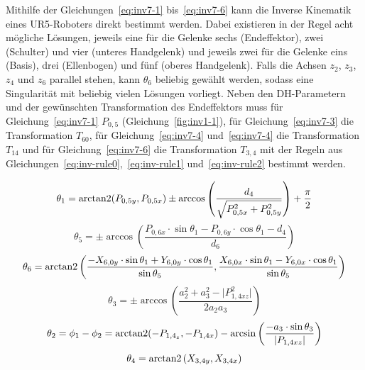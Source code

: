 Mithilfe der Gleichungen~\ref{eq:inv7-1} bis~\ref{eq:inv7-6} kann die Inverse Kinematik eines UR5-Roboters direkt bestimmt werden.
Dabei existieren in der Regel acht mögliche Lösungen, jeweils eine für die Gelenke sechs (Endeffektor), zwei (Schulter) und vier (unteres Handgelenk) und jeweils zwei für die Gelenke eins (Basis), drei (Ellenbogen) und fünf (oberes Handgelenk).
Falls die Achsen $z_2$, $z_3$, $z_4$ und $z_6$ parallel stehen, kann $\theta_6$ beliebig gewählt werden, sodass eine Singularität mit beliebig vielen Lösungen vorliegt.
Neben den DH-Parametern und der gewünschten Transformation des Endeffektors muss für Gleichung~\ref{eq:inv7-1} $P_{0,5}$ (Gleichung~\ref{fig:inv1-1}), für Gleichung~\ref{eq:inv7-3} die Transformation $T_{60}$, für Gleichung~\ref{eq:inv7-4} und~\ref{eq:inv7-4} die Transformation $T_{14}$ und für Gleichung~\ref{eq:inv7-6} die Transformation $T_{3,4}$ mit der Regeln aus Gleichungen~\ref{eq:inv-rule0},~\ref{eq:inv-rule1} und~\ref{eq:inv-rule2} bestimmt werden.

\begin{equation}
    \theta_1 = \operatorname{arctan2}(P_{0,5y}, P_{0,5x}) \pm \arccos \left( \frac{d_4}{ \sqrt{ P_{0,5x}^2 + P_{0,5y}^2 }  } \right) + \frac{\pi}{2}
    \label{eq:inv7-1}
\end{equation}
\begin{equation}
    \theta_5 = \pm \arccos \left( \frac{ P_{0,6x} \cdot \sin\theta_1 - P_{0,6y} \cdot \cos\theta_1 - d_4 }{ d_6 } \right)
    \label{eq:inv7-2}
\end{equation}
\begin{equation}
    \theta_6 =
    \operatorname{arctan2}\left(
    \frac{
        -X_{6,0y} \cdot \sin\theta_1 + Y_{6,0y} \cdot \cos\theta_1
    }{
        \sin\theta_5
    },
    \frac{
        X_{6,0x} \cdot \sin\theta_1 - Y_{6,0x} \cdot \cos\theta_1
    }{
        \sin\theta_5
    }\right)
    \label{eq:inv7-3}
\end{equation}
\begin{equation}
    \theta_3 = \pm \arccos \left(  \frac{a_2^2 + a_3^2 - \lvert P_{1,4xz}^2 \rvert}{2 a_2 a_3} \right)
    \label{eq:inv7-4}
\end{equation}
\begin{equation}
    \theta_2 = \phi_1 - \phi_2 =
    \operatorname{arctan2}(-P_{1,4_z}, -P_{1,4x}) -
    \arcsin\left( \frac{-a_3\cdot \sin \theta_3}{\lvert P_{1,4xz}\rvert} \right)
    \label{eq:inv7-5}
\end{equation}
\begin{equation}
    \theta_4 = \operatorname{arctan2}\left( X_{3,4y}, X_{3,4x} \right)
    \label{eq:inv7-6}
\end{equation}

